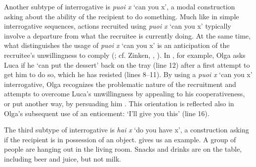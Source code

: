 \documentclass[output=paper,modfonts]{langscibook}
\begin{document}
\label{par:rossi:unwillingness} Another subtype of interrogative is \textit{puoi x} ‘can you x’, a modal construction asking about the ability of the recipient to do something. Much like in simple interrogative sequences, actions recruited using \textit{puoi x} ‘can you x’ typically involve a departure from what the recruitee is currently doing. At the same time, what distinguishes the usage of \textit{puoi x} ‘can you x’ is an anticipation of the recruitee's unwillingness to comply (\citealt[chap. 4]{Rossi2015a}; cf. Zinken, , ). In , for example, Olga asks Luca if he ‘can put the dessert’ back on the tray (line 12) after a first attempt to get him to do so, which he has resisted (lines 8--11). By using a \textit{puoi x} ‘can you x’ interrogative, Olga recognizes the problematic nature of the recruitment and attempts to overcome Luca's unwillingness by appealing to his cooperativeness, or put another way, by persuading him \citep[cf.][280--282]{ZinkenOgiermann2011}. This orientation is reflected also in Olga's subsequent use of an enticement: ‘I'll give you this’ (line 16).

The third subtype of interrogative is \textit{hai x} ‘do you have x’, a construction asking if the recipient is in possession of an object.  gives us an example. A group of people are hanging out in the living room. Snacks and drinks are on the table, including beer and juice, but not milk.
\end{document}
